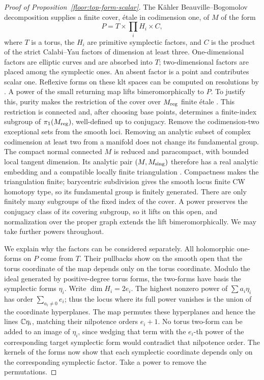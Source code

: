 \begin{proof}[Proof of Proposition~\ref{floor:top-form-scalar}]
The K\"ahler Beauville--Bogomolov decomposition
\cite[Theorem~A]{BGL} supplies a finite cover, \'etale in codimension one,
of \(M\) of the form
\[
 P=T\times\prod_i H_i\times C,
\]
where \(T\) is a torus, the \(H_i\) are primitive symplectic factors,
and \(C\) is the product of the strict Calabi--Yau factors of dimension
at least three.  One-dimensional factors are elliptic curves and are
absorbed into \(T\); two-dimensional factors are placed among the
symplectic ones.  An absent factor is a point and contributes scalar one.
Reflexive forms on these klt spaces can be computed on resolutions by
\cite[Corollary~1.8]{KebekusSchnell2021}.  A power of the
small returning map lifts bimeromorphically to \(P\).  To justify this,
purity makes the restriction of the cover over \(M_{\rm reg}\) finite
\'etale \cite[Section~3.2, before Lemma~3.7]{BGL}.  This restriction is
connected and, after choosing base points, determines a finite-index subgroup
of \(\pi_1(M_{\rm reg})\), well-defined up to conjugacy.
Remove the codimension-two exceptional sets from the smooth loci.  Removing
an analytic subset of complex codimension at least two from a manifold does
not change its fundamental group.  The compact normal connected \(M\) is
reduced and paracompact, with bounded local tangent dimension.  Its analytic
pair \((M,M_{\rm sing})\) therefore has a real analytic embedding
\cite[Theorem~1]{AcquistapaceBrogliaTognoli1979}
and a compatible locally finite triangulation
\cite[Section~3, Theorem~1]{Lojasiewicz1964}.  Compactness makes the
triangulation finite; barycentric subdivision gives the smooth locus finite
CW homotopy type, so its fundamental group is finitely generated.
There are only finitely many subgroups of
the fixed index of the cover.  A power preserves the conjugacy class of its covering subgroup,
so it lifts on this open, and normalization over the proper graph extends
the lift bimeromorphically.  We may take further powers throughout.

We explain why the factors can be considered separately.  All holomorphic
one-forms on \(P\) come from \(T\).  Their pullbacks show on the smooth
open that the torus coordinate of the map depends only on the torus
coordinate.  Modulo the ideal generated by positive-degree torus forms,
the two-forms have basis the symplectic forms \(\eta_i\).  Write
\(\dim H_i=2e_i\).  The highest nonzero power of \(\sum a_i\eta_i\)
has order \(\sum_{a_i\ne0}e_i\); thus the locus where its full power
vanishes is the union of the coordinate hyperplanes.  The map permutes
these hyperplanes and hence the lines \(\mathbb C\eta_i\), matching their
nilpotence orders \(e_i+1\).  No torus two-form can be added to an image
of \(\eta_i\), since wedging that term with the \(e_i\)-th power of the
corresponding target symplectic form would
contradict that nilpotence order.  The kernels of the forms now show that
each symplectic coordinate depends only on the corresponding symplectic
factor.  Take a power to remove the permutations.


\end{proof}
